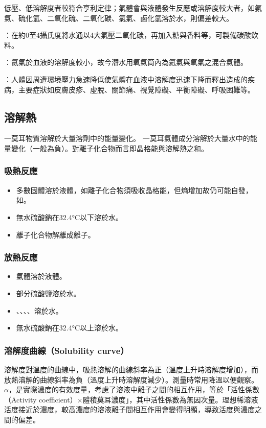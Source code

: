 \documentclass[a4paper,12pt]{article}
\begin{document}
低壓、低溶解度者較符合亨利定律；氣體會與液體發生反應或溶解度較大者，如氨氣、硫化氫、二氧化硫、二氧化碳、氯氣、鹵化氫溶於水，則偏差較大。
\bit
\item {}：在約0至4攝氏度將水通以4大氣壓二氧化碳，再加入糖與香料等，可製備碳酸飲料。
\item {}：氦氣於血液的溶解度較小，故今潛水用氧氣筒內為氦氣與氧氣之混合氣體。
\item {}：人體因周遭環境壓力急速降低使氣體在血液中溶解度迅速下降而釋出造成的疾病，主要症狀如皮膚皮疹、虛脫、關節痛、視覺障礙、平衡障礙、呼吸困難等。
\eit
\subsection{溶解熱}
一莫耳物質溶解於大量溶劑中的能量變化。
一莫耳氣體成分溶解於大量水中的能量變化（一般為負）。對離子化合物而言即晶格能與溶解熱之和。
\subsubsection{吸熱反應}
\begin{itemize}
\item 多數固體溶於液體，如離子化合物須吸收晶格能，但熵增加故仍可能自發，如。
\item 無水硫酸鈉在32.4°C以下溶於水。
\item 離子化合物解離成離子。
\end{itemize}
\subsubsection{放熱反應}
\begin{itemize}
\item 氣體溶於液體。
\item 部分硫酸鹽溶於水。
\item {}、、、、溶於水。
\item 無水硫酸鈉在32.4°C以上溶於水。
\end{itemize}
\subsubsection{溶解度曲線（Solubility curve）}
溶解度對溫度的曲線中，吸熱溶解的曲線斜率為正（溫度上升時溶解度增加），而放熱溶解的曲線斜率為負（溫度上升時溶解度減少）。測量時常用降溫以便觀察。
$\alpha$，是實際濃度的有效度量，考慮了溶液中離子之間的相互作用，等於「活性係數（Activity coefficient）$\times$體積莫耳濃度」，其中活性係數為無因次量。理想稀溶液活度接近於濃度，較高濃度的溶液離子間相互作用會變得明顯，導致活度與濃度之間的偏差。
\end{document}
